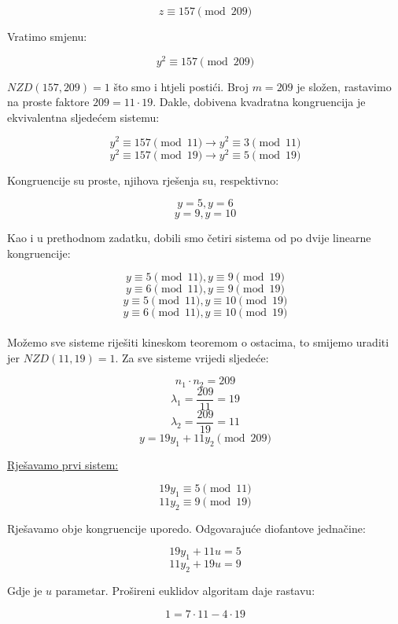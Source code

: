 \documentclass[12pt]{article}
\begin{document}
$$z \equiv 157 \pmod{209}$$\vspace{1mm}

Vratimo smjenu:

$$y^2 \equiv 157 \pmod{209}$$\vspace{1mm}

$NZD(157, 209) = 1$ što smo i htjeli postići. Broj $m = 209$ je složen, rastavimo na proste faktore $209 = 11 \cdot 19$. Dakle, dobivena kvadratna kongruencija je ekvivalentna sljedećem sistemu:

$$y^2 \equiv 157 \pmod{11} \to y^2 \equiv 3 \pmod{11}$$
$$y^2 \equiv 157 \pmod{19} \to y^2 \equiv 5 \pmod{19}$$\vspace{1mm}

Kongruencije su proste, njihova rješenja su, respektivno:

$$y = 5, y = 6$$
$$y = 9, y = 10$$\vspace{1mm}

Kao i u prethodnom zadatku, dobili smo četiri sistema od po dvije linearne kongruencije:

\[
y \equiv 5 \pmod{11}, y \equiv 9 \pmod{19} \label{eq:Z6eq1a} \tag{1}
\]
\[
y \equiv 6 \pmod{11}, y \equiv 9 \pmod{19} \label{eq:Z6eq1b} \tag{2}
\]
\[
y \equiv 5 \pmod{11}, y \equiv 10 \pmod{19} \label{eq:Z6eq1c} \tag{3}
\]
\[
y \equiv 6 \pmod{11}, y \equiv 10 \pmod{19} \label{eq:Z6eq1d} \tag{4}
\]
\\

Možemo sve sisteme riješiti kineskom teoremom o ostacima, to smijemo uraditi jer $NZD(11, 19) = 1$. Za sve sisteme vrijedi sljedeće:

$$n_{1} \cdot n_{2} = 209$$
$$\lambda_{1} = \frac{209}{11} = 19$$
$$\lambda_{2} = \frac{209}{19} = 11$$
$$y = 19y_{1} + 11y_{2} \pmod{209}$$\vspace{1mm}

\underline{Rješavamo prvi sistem:}

$$19y_{1} \equiv 5 \pmod{11}$$
$$11y_{2} \equiv 9 \pmod{19}$$\vspace{1mm}

Rješavamo obje kongruencije uporedo. Odgovarajuće diofantove jednačine:

$$19y_{1} + 11u = 5$$
$$11y_{2} + 19u = 9$$\vspace{1mm}

Gdje je $u$ parametar. Prošireni euklidov algoritam daje rastavu:

$$1 = 7 \cdot 11 - 4 \cdot 19$$\vspace{1mm}
\end{document}
